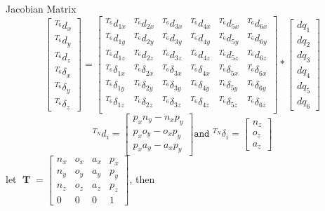 \documentclass[12pt]{article}
\DeclareMathOperator{\T}{\mathbf{T}}
\begin{document}
  Jacobian Matrix
  $$\begin{bmatrix}
    ^{T_6}d_x \\ ^{T_6}d_y \\ ^{T_6}d_z \\ ^{T_6}\delta_x \\ ^{T_6}\delta_y \\ ^{T_6}\delta_z
  \end{bmatrix} =
  \begin{bmatrix}
    ^{T_6}d_{1x} & ^{T_6}d_{2x} & ^{T_6}d_{3x} & ^{T_6}d_{4x} & ^{T_6}d_{5x} & ^{T_6}d_{6x}\\
    ^{T_6}d_{1y} & ^{T_6}d_{2y} & ^{T_6}d_{3y} & ^{T_6}d_{4y} & ^{T_6}d_{5y} & ^{T_6}d_{6y}\\
    ^{T_6}d_{1z} & ^{T_6}d_{2z} & ^{T_6}d_{3z} & ^{T_6}d_{4z} & ^{T_6}d_{5z} & ^{T_6}d_{6z}\\
    ^{T_6}\delta_{1x} & ^{T_6}\delta_{2x} & ^{T_6}\delta_{3x} & ^{T_6}\delta_{4x} & ^{T_6}\delta_{5x} & ^{T_6}\delta_{6x}\\
    ^{T_6}\delta_{1y} & ^{T_6}\delta_{2y} & ^{T_6}\delta_{3y} & ^{T_6}\delta_{4y} & ^{T_6}\delta_{5y} & ^{T_6}\delta_{6y}\\
    ^{T_6}\delta_{1z} & ^{T_6}\delta_{2z} & ^{T_6}\delta_{3z} & ^{T_6}\delta_{4z} & ^{T_6}\delta_{5z} & ^{T_6}\delta_{6z}\\
  \end{bmatrix} *
  \begin{bmatrix}
    dq_1 \\ dq_2 \\ dq_3 \\ dq_4 \\ dq_5 \\ dq_6
  \end{bmatrix}
  $$
  $$
  ^{T_N}d_i =
  \begin{bmatrix}
  p_xn_y-n_xp_y \\ p_xo_y-o_xp_y \\ p_xa_y-a_xp_y
  \end{bmatrix} \texttt{and  }
  ^{T_N}\delta_i =
  \begin{bmatrix}
  n_z \\ o_z \\ a_z
  \end{bmatrix}
  $$
  let
  $\T = \begin{bmatrix}
    n_x & o_x & a_x & p_x\\
    n_y & o_y & a_y & p_y\\
    n_z & o_z & a_z & p_z\\
    0 & 0 & 0 & 1
  \end{bmatrix}$, then
\end{document}
